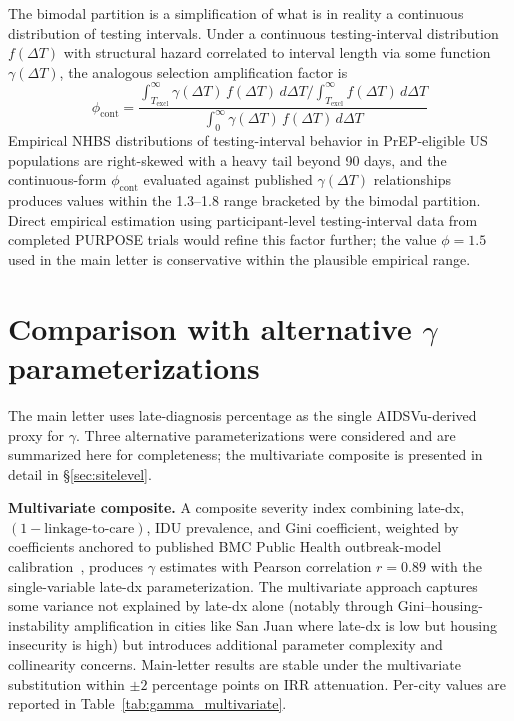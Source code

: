 \documentclass[11pt]{article}
\begin{document}
The bimodal partition is a simplification of what is in reality a continuous distribution of testing intervals. Under a continuous testing-interval distribution $f(\Delta T)$ with structural hazard correlated to interval length via some function $\gamma(\Delta T)$, the analogous selection amplification factor is
\begin{equation}
\phi_{\mathrm{cont}} = \frac{\int_{T_{\mathrm{excl}}}^{\infty} \gamma(\Delta T)\, f(\Delta T)\, d\Delta T \big/ \int_{T_{\mathrm{excl}}}^{\infty} f(\Delta T)\, d\Delta T}{\int_0^{\infty} \gamma(\Delta T)\, f(\Delta T)\, d\Delta T}
\end{equation}
Empirical NHBS distributions of testing-interval behavior in PrEP-eligible US populations are right-skewed with a heavy tail beyond 90 days, and the continuous-form $\phi_{\mathrm{cont}}$ evaluated against published $\gamma(\Delta T)$ relationships~\cite{nhbs2023,bjs2023} produces values within the 1.3--1.8 range bracketed by the bimodal partition. Direct empirical estimation using participant-level testing-interval data from completed PURPOSE trials would refine this factor further; the value $\phi = 1.5$ used in the main letter is conservative within the plausible empirical range.

\section{Comparison with alternative \texorpdfstring{$\gamma$}{gamma} parameterizations}

The main letter uses late-diagnosis percentage as the single AIDSVu-derived proxy for $\gamma$. Three alternative parameterizations were considered and are summarized here for completeness; the multivariate composite is presented in detail in §\ref{sec:sitelevel}.

\textbf{Multivariate composite.} A composite severity index combining late-dx, $(1 - \text{linkage-to-care})$, IDU prevalence, and Gini coefficient, weighted by coefficients anchored to published BMC Public Health outbreak-model calibration~\cite{demidont_barriers_synergy}, produces $\gamma$ estimates with Pearson correlation $r = 0.89$ with the single-variable late-dx parameterization. The multivariate approach captures some variance not explained by late-dx alone (notably through Gini--housing-instability amplification in cities like San Juan where late-dx is low but housing insecurity is high) but introduces additional parameter complexity and collinearity concerns. Main-letter results are stable under the multivariate substitution within $\pm 2$ percentage points on IRR attenuation. Per-city values are reported in Table~\ref{tab:gamma_multivariate}.
\end{document}
